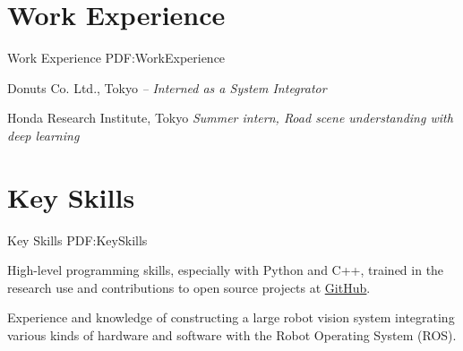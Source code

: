 \documentclass[letterpaper,MMMyyyy,nonstop]{simpleresumecv}
\begin{document}
\begin{body}

\section
{Work Experience}
{Work Experience}
{PDF:WorkExperience}

Donuts Co. Ltd., Tokyo
\hfill
\textit{ -- }
\newline
\textit{Interned as a System Integrator}

\BigGapNoBreak

Honda Research Institute, Tokyo
\hfill
\textit{}
\newline
\textit{Summer intern, Road scene understanding with deep learning}

%
%
%
%


\section
{Key Skills}
{Key Skills}
{PDF:KeySkills}

\BulletItem
High-level programming skills, especially with Python and C++,
trained in the research use and contributions to open source projects at
\href{http://github.com/wkentaro}{\underline{GitHub}}.

\BulletItem
Experience and knowledge of constructing a large robot vision system integrating various kinds of hardware and software
with the Robot Operating System (ROS).


\end{body}
\end{document}
